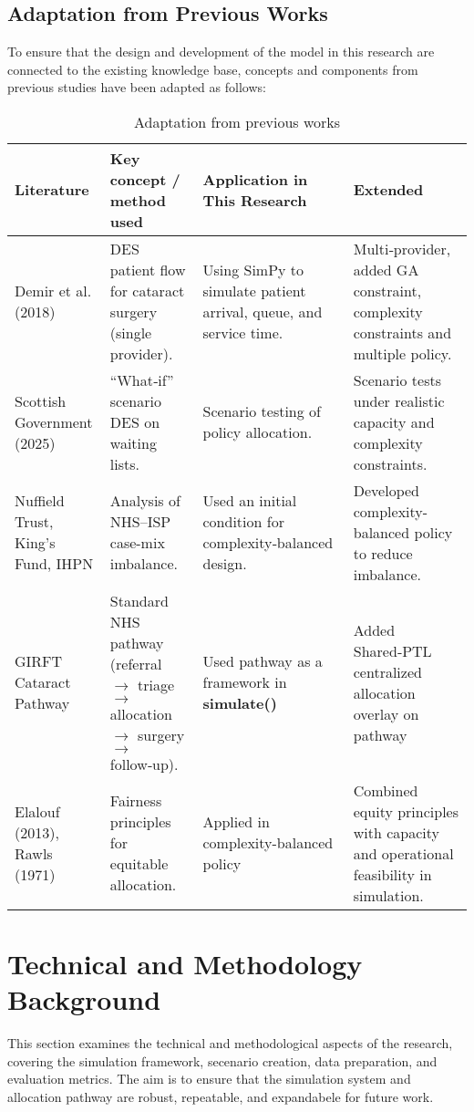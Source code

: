 \documentclass[ %
                    author={Nattanan Nawakitbamrung},
                supervisor={Dr. Sébastien Rochat},
                    degree={MSc},
                     title={Developing and Evaluating the Impact of a Single Patient Treatment List (PTL) for an NHS Integrated Care System},
                  subtitle={},
                      type={},
                      year={2025}]{dissertation}
\begin{document}
\subsection{Adaptation from Previous Works}
To ensure that the design and development of the model in this research are connected to the existing knowledge base, concepts and components from previous studies have been adapted as follows:
\noindent
\begin{table}[h!]
\centering
\renewcommand{\arraystretch}{1.25}    
\setlength{\tabcolsep}{6pt}            
\begin{tabular}{|p{2.5cm}|p{5cm}|p{3.5cm}|p{3.5cm}|}
\hline
\textbf{Literature} & \textbf{Key concept / method used} & \textbf{Application in This Research} & \textbf{Extended} \\
\hline
Demir et al. (2018) &
DES patient flow for cataract surgery (single provider). & 
Using SimPy to simulate patient arrival, queue, and service time.&
Multi‑provider, added GA constraint, complexity constraints and multiple policy. \\
\hline
Scottish Government (2025) &
“What‑if” scenario DES on waiting lists. &
Scenario testing of policy allocation. &
Scenario tests under realistic capacity and complexity constraints. \\
\hline
Nuffield Trust, King’s Fund, IHPN &
Analysis of NHS–ISP case-mix imbalance. &
Used an initial condition for complexity‑balanced design. &
Developed complexity-balanced policy to reduce imbalance. \\
\hline
GIRFT Cataract Pathway &
Standard NHS pathway (referral $\rightarrow$ triage $\rightarrow$ allocation $\rightarrow$ surgery $\rightarrow$ follow‑up). &
Used pathway as a framework in \textbf{simulate()} &
Added Shared‑PTL centralized allocation overlay on pathway \\
\hline
Elalouf (2013), Rawls (1971) &
Fairness principles for equitable allocation. &
Applied in complexity-balanced policy&
Combined equity principles with capacity and operational feasibility in simulation.\\
\hline
\end{tabular}
\caption{Adaptation from previous works}
\label{tab:adaptation}
\end{table}

\section{Technical and Methodology Background}
This section examines the technical and methodological aspects of the research, covering the simulation framework, secenario creation, data preparation, and evaluation metrics. The aim is to ensure that the simulation system and allocation pathway are robust, repeatable, and expandabele for future work.
\end{document}

